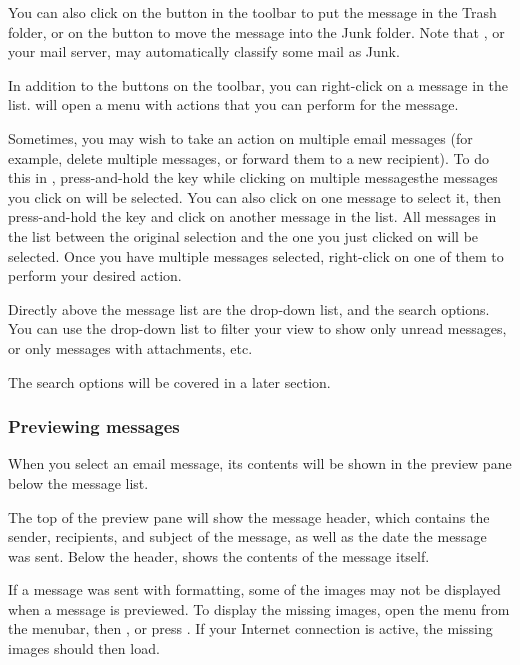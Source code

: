 You can also click on the  button in the toolbar to put 
the message in the Trash folder, or on the  button to move the 
message into the Junk folder. Note that , or your mail server, may
automatically classify some mail as Junk.

In addition to the buttons on the toolbar, you can right-click on a message
in the list.  will open a menu with actions that you can perform
for the message. 

Sometimes, you may wish to take an action on multiple email messages (for 
example, delete multiple messages, or forward them to a new recipient).
To do this in , press-and-hold the  key while
clicking on multiple messages\dash the messages you click on will be selected. 
You can also click on one message to select it, then press-and-hold the 
 key and click on another message in the list. All messages
in the list between the original selection and the one you just clicked on will
be selected. Once you have multiple messages selected, right-click on one of 
them to perform your desired action.

Directly above the message list are the  drop-down list, and the 
search options. You can use the  drop-down list to filter your 
view to show only unread messages, or only messages with attachments, etc.

The search options will be covered in a later section.

\subsubsection{Previewing messages}

When you select an email message, its contents will be shown in the preview
pane below the message list. 

The top of the preview pane will show the message header, which contains the
sender, recipients, and subject of the message, as well as the date the 
message was sent. Below the header,  shows the contents of the message
itself.

If a message was sent with  formatting, some of the images may not be 
displayed when a message is previewed. To display the missing images,
open the  menu from the menubar, then , or 
press . If your Internet connection is active, the missing
images should then load.

